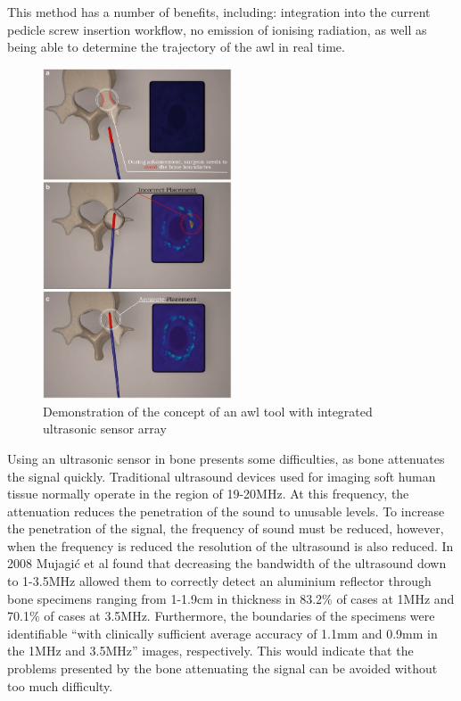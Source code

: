 \documentclass[conference, a4paper]{IEEEtran}
\begin{document}
This method has a number
of benefits, including: integration into the current pedicle screw insertion
workflow, no emission of ionising radiation, as well as being able to determine
the trajectory of the awl in real time.

\begin{figure}[h!]
	\centering
	\includegraphics[width=0.5\textwidth]{assets/ultraArray.jpg}
	\caption{Demonstration of the concept of an awl tool with integrated ultrasonic sensor array\cite{Manbachi2016}}
	\label{fig:ultraArray}
\end{figure}

Using an ultrasonic sensor in bone presents some difficulties, as bone attenuates
the signal quickly. Traditional ultrasound devices used for imaging soft
human tissue normally operate in the region of 19-20MHz. At this frequency,
the attenuation reduces the penetration of the sound to unusable levels\cite{Laugier2011}.
To increase the penetration of the signal, the frequency of sound must be reduced, however,
when the frequency is reduced the resolution of the ultrasound is also reduced. In 2008 Mujagić
et al found that decreasing the bandwidth of the ultrasound down to 1-3.5MHz allowed them to
correctly detect an aluminium reflector through bone specimens ranging from 1-1.9cm in thickness in
83.2$\%$ of cases at 1MHz and 70.1$\%$ of cases at 3.5MHz. Furthermore, the boundaries
of the specimens were identifiable ``with clinically sufficient average accuracy of 1.1mm and 0.9mm in the 1MHz
and 3.5MHz'' images, respectively\cite{Mujagic2008}. This would indicate that the 
problems presented by the bone attenuating the signal can be avoided without too much
difficulty.
\end{document}
